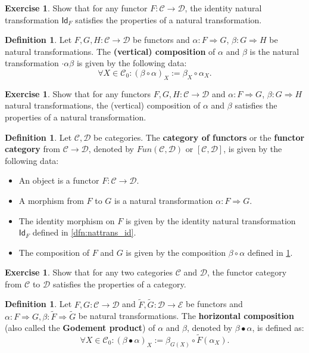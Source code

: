 \documentclass[a4paper,10pt]{scrartcl}
\theoremstyle{plain}
\theoremstyle{definition}
\newtheorem{dfn}[thm]{Definition}
\newtheorem{exer}[thm]{Exercise}
\newcommand{\cfont}[1]{\ensuremath{\mathsf{#1}}}
\newcommand{\Cat}[1]{\mathcal{#1}}
\newcommand{\CC}{\Cat{C}}
\newcommand{\DD}{\Cat{D}}
\newcommand{\EE}{\Cat{E}}
\newcommand{\Ob}[1]{{#1}_0}
\newcommand{\Id}[1][]{\cfont{Id}_{#1}}
\newcommand{\Comp}{\cdot}
\newcommand{\NatTrans}[3]{#1 : #2 \Rightarrow #3}
\newcommand{\co}[2]{\ensuremath{#2 \circ #1}}
\begin{document}
\begin{exer} Show that for any functor $F:\CC\to\DD$, the identity natural transformation $\Id[F]$ satisfies the properties of a natural transformation.
\end{exer}

\begin{dfn}\label{dfn:nattrans_comp} Let $F,G,H: \CC\to\DD$ be functors and $\NatTrans{\alpha}{F}{G}$, $\NatTrans{\beta}{G}{H}$ be natural transformations. The \textbf{(vertical) composition} of $\alpha$ and $\beta$ is the natural transformation $\Comp{\alpha}{\beta}$ is given by the following data:
\[
\forall X\in\Ob{\CC}: (\co{\alpha}{\beta})_{X} := \co{\alpha_X}{\beta_X}.
\]
\end{dfn}

\begin{exer} Show that for any functors $F,G,H: \CC\to\DD$ and $\NatTrans{\alpha}{F}{G}$, $\NatTrans{\beta}{G}{H}$ natural transformations, the (vertical) composition of $\alpha$ and $\beta$ satisfies the properties of a natural transformation.
\end{exer}

\begin{dfn} Let $\CC,\DD$ be categories. The \textbf{category of functors} or the \textbf{functor category} from $\CC\to\DD$, denoted by $Fun(\CC,\DD)$ or $[\CC,\DD]$, is given by the following data:
\begin{itemize}
\item An object is a functor $F:\CC\to\DD$.
\item A morphism from $F$ to $G$ is a natural transformation $\NatTrans{\alpha}{F}{G}$.
\item The identity morphism on $F$ is given by the identity natural transformation $\Id[F]$ defined in \cref{dfn:nattrans_id}.
\item The composition of $F$ and $G$ is given by the composition $\co{\alpha}{\beta}$ defined in \cref{dfn:nattrans_comp}.
\end{itemize}
\end{dfn}

\begin{exer} Show that for any two categories $\CC$ and $\DD$, the functor category from $\CC$ to $\DD$ satisfies the properties of a category.
\end{exer}

\begin{dfn}\label{dfn:nattrans_horcomp} Let $F,G : \CC\to\DD$ and $\tilde{F},\tilde{G}:\DD\to\EE$ be functors and $\NatTrans{\alpha}{F}{G}, \NatTrans{\beta}{\tilde{F}}{\tilde{G}}$ be natural transformations. The \textbf{horizontal composition} (also called the \textbf{Godement product}) of $\alpha$ and $\beta$, denoted by $\beta \bullet \alpha$, is defined as:
\begin{equation}\label{eqn:nattrans_horcomp}
\forall X\in \Ob{\CC}: (\beta\bullet\alpha)_X := \co{\tilde{F}(\alpha_X)}{\beta_{G(X)}}.
\end{equation}
\end{dfn}
\end{document}

